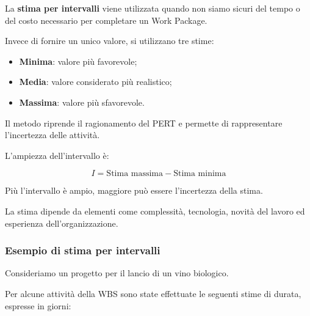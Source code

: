 \noindent La \textbf{stima per intervalli} viene utilizzata
quando non siamo sicuri del tempo o del costo
necessario per completare un Work Package.

\noindent Invece di fornire un unico valore,
si utilizzano tre stime:

\begin{itemize}
    \item \textbf{Minima}: valore più favorevole;
    \item \textbf{Media}: valore considerato più realistico;
    \item \textbf{Massima}: valore più sfavorevole.
\end{itemize}

\noindent Il metodo riprende il ragionamento del PERT
e permette di rappresentare l'incertezza
delle attività.

\medskip

\noindent L'ampiezza dell'intervallo è:

\[
\boxed{
I=\text{Stima massima}-\text{Stima minima}
}
\]

\noindent Più l'intervallo è ampio,
maggiore può essere l'incertezza della stima.

\medskip

\noindent La stima dipende da elementi come
complessità, tecnologia, novità del lavoro
ed esperienza dell'organizzazione.

\subsubsection*{Esempio di stima per intervalli}

\noindent Consideriamo un progetto per il lancio
di un vino biologico.

\noindent Per alcune attività della WBS
sono state effettuate le seguenti stime
di durata, espresse in giorni:

